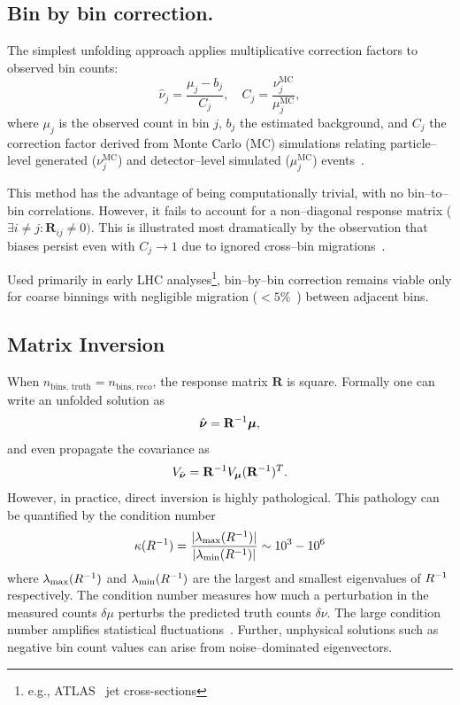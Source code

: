 \subsection{Bin by bin correction.}  
The simplest unfolding approach applies multiplicative correction factors to observed bin counts:  
\begin{equation}
    \hat{\nu}_j = \frac{\mu_j - b_j}{C_j}, \quad C_j = \frac{\nu^{\text{MC}}_j}{\mu^{\text{MC}}_j},
\end{equation}  
where \(\mu_j\) is the observed count in bin \(j\), \(b_j\) the estimated background, and \(C_j\) the correction factor derived from Monte Carlo (MC) simulations relating particle--level generated (\(\nu^{\text{MC}}_j\)) and detector--level simulated (\(\mu^{\mathrm{MC}}_j\)) events~\cite{cowan_statistics_2021}. 

This method has the advantage of being computationally trivial, with no bin--to--bin correlations.
%
However, it fails to account for a non--diagonal response matrix (\(\exists i \neq j: \mathbf{R}_{ij} \ne 0)\).
%
This is illustrated most dramatically by the observation that biases persist even with \(C_j \rightarrow 1\) due to ignored cross--bin migrations~\cite{cowan_topics_2010}.

Used primarily in early LHC analyses\footnote{e.g., ATLAS~\cite{aad_measurement_2011, noauthor_implications_nodate} jet cross-sections}, bin--by--bin correction remains viable only for coarse binnings with negligible migration (\(<5\%\)~\cite{cms_collaboration_measurement_2011}) between adjacent bins.

\subsection{Matrix Inversion}  
When \(n_{\text{bins, truth}} = n_{\text{bins, reco}}\), the response matrix $\mathbf{R}$ is square.
%
Formally one can write an unfolded solution as  
\begin{equation}
    \hat{\boldsymbol{\nu}} = \mathbf{R}^{-1}\vb*{\mu},
\end{equation}  
and even propagate the covariance as  
\begin{equation}
    V_{\hat{\boldsymbol{\nu}}} = \mathbf{R}^{-1} V_{\vb*{\mu}} (\mathbf{R}^{-1})^T.
\end{equation}  
However, in practice, direct inversion is highly pathological.
%
This pathology can be quantified by the condition number
\begin{equation}
    \kappa(R^{-1}) = \frac{|\lambda_{\mathrm{max}}(R^{-1})|}{|\lambda_{\mathrm{min}}(R^{-1})|} \sim 10^3 - 10^6
\end{equation}
where $\lambda_{\mathrm{max}}(R^{-1})$ and $\lambda_{\mathrm{min}}(R^{-1})$ are the largest and smallest eigenvalues of $R^{-1}$ respectively.
%
The condition number measures how much a perturbation in the measured counts $\delta\mu$ perturbs the predicted truth counts $\delta\nu$.
%
The large condition number amplifies statistical fluctuations~\cite{belsley_regression_2005, pesaran_time_2015}.
%
Further, unphysical solutions such as negative bin count values can arise from noise--dominated eigenvectors.

